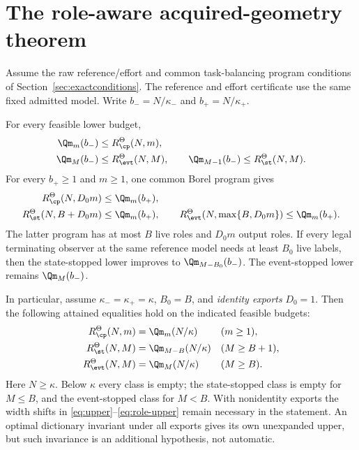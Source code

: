 \section{The role-aware acquired-geometry theorem}
\begin{theorem}\label{thm:main}
Assume the raw reference/effort and common task-balancing program conditions of Section~\ref{sec:exactconditions}. The reference and effort certificate use the same fixed admitted model. Write $b_-=N/\kappa_-$ and $b_+=N/\kappa_+$.

For every feasible lower budget,
\begin{align}
 \Qm_m(b_-)&\le R_\cp^\Theta(N,m),\label{eq:cp-lower}\\
 \Qm_M(b_-)&\le R_\evt^\Theta(N,M),\qquad
 \Qm_{M-1}(b_-)\le R_\st^\Theta(N,M).\label{eq:aut-lower}
\end{align}
For every $b_+\ge1$ and $m\ge1$, one common Borel program gives
\begin{align}
 R_\cp^\Theta(N,D_0m)&\le\Qm_m(b_+),\label{eq:upper}\\
 R_\st^\Theta(N,B+D_0m)&\le\Qm_m(b_+),\qquad
 R_\evt^\Theta(N,\max\{B,D_0m\})\le\Qm_m(b_+).\label{eq:role-upper}
\end{align}
The latter program has at most $B$ live roles and $D_0m$ output roles. If every legal terminating observer at the same reference model needs at least $B_0$ live labels, then the state-stopped lower improves to $\Qm_{M-B_0}(b_-)$. The event-stopped lower remains $\Qm_M(b_-)$.

In particular, assume $\kappa_- =\kappa_+=\kappa$, $B_0=B$, and \emph{identity exports} $D_0=1$. Then the following attained equalities hold on the indicated feasible budgets:
\begin{align}
 R_\cp^\Theta(N,m)&=\Qm_m(N/\kappa) &&(m\ge1),\label{eq:exact-cp}\\
 R_\st^\Theta(N,M)&=\Qm_{M-B}(N/\kappa) &&(M\ge B+1),\label{eq:exact-state}\\
 R_\evt^\Theta(N,M)&=\Qm_M(N/\kappa) &&(M\ge B).\label{eq:exact-event}
\end{align}
Here $N\ge\kappa$. Below $\kappa$ every class is empty; the state-stopped class is empty for $M\le B$, and the event-stopped class for $M<B$. With nonidentity exports the width shifts in \eqref{eq:upper}--\eqref{eq:role-upper} remain necessary in the statement. An optimal dictionary invariant under all exports gives its own unexpanded upper, but such invariance is an additional hypothesis, not automatic.
\end{theorem}

